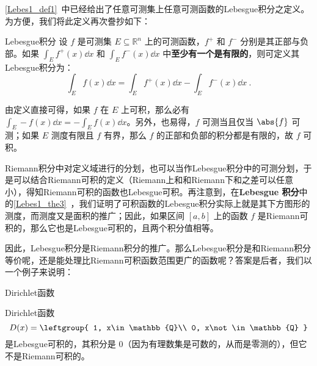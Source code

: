 

\autoref{Lebes1_def1}~中已经给出了任意可测集上任意可测函数的Lebesgue积分之定义。为方便，我们将此定义再次誊抄如下：

\begin{definition}{Lebesgue积分}
设 $f$ 是可测集 $E\subseteq\mathbb{R}^n$ 上的可测函数，$f^+$ 和 $f^-$ 分别是其正部与负部。如果 $\int_E f^+(x) \dd x$ 和 $\int_E f^-(x) \dd x$ 中\textbf{至少有一个是有限的}，则可定义其Lebesgue积分为：
\begin{equation}
\int_E f(x) \dd x = \int_E f^+(x) \dd x - \int_E f^-(x) \dd x~.
\end{equation}
\end{definition}

由定义直接可得，如果 $f$ 在 $E$ 上可积，那么必有 $\int_E -f(x) \dd x = -\int_E f(x) \dd x$。另外，也易得，$f$ 可测当且仅当 $\abs{f}$ 可测；如果 $E$ 测度有限且 $f$ 有界，那么 $f$ 的正部和负部的积分都是有限的，故 $f$ 可积。



Riemann积分中对定义域进行的分划，也可以当作Lebesgue积分中的可测分划，于是可以结合Riemann可积的定义（Riemann上和和Riemann下和之差可以任意小），得知Riemann可积的函数也Lebesgue可积。再注意到，在\textbf{Lebesgue 积分}中的\autoref{Lebes1_the3}~，我们证明了可积函数的Lebesgue积分实际上就是其下方图形的测度，而测度又是面积的推广；因此，如果区间 $[a, b]$ 上的函数 $f$ 是Riemann可积的，那么它也是Lebesgue可积的，且两个积分值相等。

因此，Lebesgue积分是Riemann积分的推广。那么Lebesgue积分是和Riemann积分等价呢，还是能处理比Riemann可积函数范围更广的函数呢？答案是后者，我们以一个例子来说明：

\begin{example}{Dirichlet函数}

Dirichlet函数
\begin{equation}
D(x)=
\leftgroup{
    1, x\in\mathbb{Q}\\
    0, x\not\in\mathbb{Q}
}
\end{equation}
是Lebesgue可积的，其积分是 $0$（因为有理数集是可数的，从而是零测的），但它不是Riemann可积的。

\end{example}
















